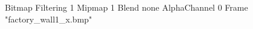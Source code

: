 {Bitmap
	{Filtering 1}
	{Mipmap 1}
	{Blend none}
	{AlphaChannel 0}
	{Frame "factory_wall1_x.bmp"}
}
